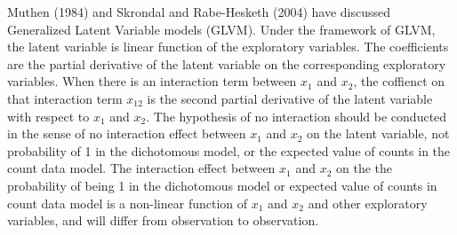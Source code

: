 Muthen (1984) and Skrondal and Rabe-Hesketh (2004) have discussed
Generalized Latent Variable models (GLVM).  Under the framework of
GLVM, the latent variable is linear function of the exploratory
variables.  The coefficients are the partial derivative of the latent
variable on the corresponding exploratory variables.  When there is an
interaction term between $x_1$ and $x_2$, the coffienct on that
interaction term $x_{12}$ is the second partial derivative of the
latent variable with respect to $x_1$ and $x_2$.  The hypothesis of no
interaction should be conducted in the sense of no interaction effect
between $x_1$ and $x_2$ on the latent variable, not probability of 1
in the dichotomous model, or the expected value of counts in the count
data model.  The interaction effect
between $x_1$ and $x_2$ on the the probability of being 1 in the
dichotomous model or expected value of counts in count data model is a
non-linear function of $x_1$ and $x_2$ and other exploratory
variables, and will differ from observation to observation.
